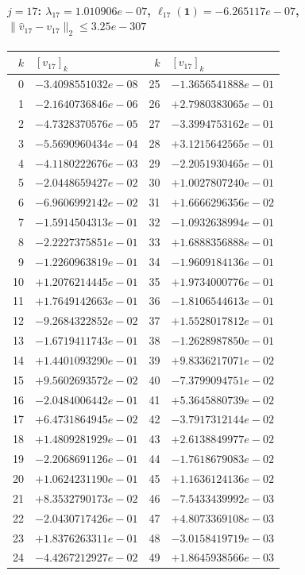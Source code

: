 \paragraph{$j = 17$: $\lambda_{17} = 1.010906e-07$, \quad $\ell_{17}(\mathbf{1}) = -6.265117e-07$, \quad $\|\hat{v}_{17} - v_{17}\|_2 \leq 3.25e-307$}
\begin{center}
{\footnotesize
\begin{tabular}{r@{\;\;}l@{\quad}r@{\;\;}l}
\toprule
$k$ & $[v_{17}]_k$ & $k$ & $[v_{17}]_k$ \\
\midrule
0 & $-3.4098551032e-08$ & 25 & $-1.3656541888e-01$ \\
1 & $-2.1640736846e-06$ & 26 & $+2.7980383065e-01$ \\
2 & $-4.7328370576e-05$ & 27 & $-3.3994753162e-01$ \\
3 & $-5.5690960434e-04$ & 28 & $+3.1215642565e-01$ \\
4 & $-4.1180222676e-03$ & 29 & $-2.2051930465e-01$ \\
5 & $-2.0448659427e-02$ & 30 & $+1.0027807240e-01$ \\
6 & $-6.9606992142e-02$ & 31 & $+1.6666296356e-02$ \\
7 & $-1.5914504313e-01$ & 32 & $-1.0932638994e-01$ \\
8 & $-2.2227375851e-01$ & 33 & $+1.6888356888e-01$ \\
9 & $-1.2260963819e-01$ & 34 & $-1.9609184136e-01$ \\
10 & $+1.2076214445e-01$ & 35 & $+1.9734000776e-01$ \\
11 & $+1.7649142663e-01$ & 36 & $-1.8106544613e-01$ \\
12 & $-9.2684322852e-02$ & 37 & $+1.5528017812e-01$ \\
13 & $-1.6719411743e-01$ & 38 & $-1.2628987850e-01$ \\
14 & $+1.4401093290e-01$ & 39 & $+9.8336217071e-02$ \\
15 & $+9.5602693572e-02$ & 40 & $-7.3799094751e-02$ \\
16 & $-2.0484006442e-01$ & 41 & $+5.3645880739e-02$ \\
17 & $+6.4731864945e-02$ & 42 & $-3.7917312144e-02$ \\
18 & $+1.4809281929e-01$ & 43 & $+2.6138849977e-02$ \\
19 & $-2.2068691126e-01$ & 44 & $-1.7618679083e-02$ \\
20 & $+1.0624231190e-01$ & 45 & $+1.1636124136e-02$ \\
21 & $+8.3532790173e-02$ & 46 & $-7.5433439992e-03$ \\
22 & $-2.0430717426e-01$ & 47 & $+4.8073369108e-03$ \\
23 & $+1.8376263311e-01$ & 48 & $-3.0158419719e-03$ \\
24 & $-4.4267212927e-02$ & 49 & $+1.8645938566e-03$ \\
\bottomrule
\end{tabular}
}
\end{center}

